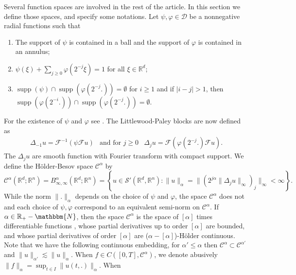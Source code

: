 \documentclass[a4paper,11pt]{article}
\newcommand{\tmop}[1]{\ensuremath{\operatorname{#1}}}
\newcommand{\CC}{\mathscr C}
\newcommand{\CF}{\mathscr F}
\newcommand{\RR}{\mathbb R}
\begin{document}
Several function spaces are involved in the rest of the article. In this
section we define those spaces, and specify some notations.
Let $\psi , \varphi \in \mathcal{D}$ be a nonnegative radial functions such
that
\begin{enumerate}
  \item The support of $\psi$ is contained in a ball and the support of
  $\varphi$ is contained in an annulus;
  
  \item $\psi ( \xi ) + \sum_{j \ge 0} \varphi (2^{-j} \xi ) =1$ for all $\xi
  \in \RR^{d}$;
  
  \item $\tmop{supp} ( \psi ) \cap \tmop{supp} ( \varphi (2^{-j} . )) =
  \emptyset$ for $i \ge 1$ and if $|i-j| >1$, then $\tmop{supp} ( \varphi
  (2^{-i}. )) \cap \tmop{supp} ( \varphi (2^{-j} .)) = \emptyset$.
\end{enumerate}
For the existence of $\psi$ and $\varphi$ see {\cite{bahouri_fourier_2011}}.
The Littlewood-Paley blocks are now defined as
\[ \begin{array}{crlc}
     \Delta_{-1} u= \CF^{-1} ( \psi \CF u) & \text{and for $j\ge 0$}
 & \Delta_{j} u= \CF ( \varphi (2^{-j} .) \CF u) .
   \end{array} \]
The $\Delta_{j} u$ are smooth function with Fourier transform with compact
support. We define the Hölder-Besov space $\CC^{\alpha}$ by
\begin{equation}\label{eq:besov_holder}
 \CC^{\alpha} ( \RR^{d} ; \RR^{n} ) =B^{\alpha}_{\infty , \infty} ( \RR^{d}
   ; \RR^{n} ) = \left\{ u \in \mathcal{S}' ( \RR^{d} , \RR^{n}
   ):\|u\|_{\alpha} =\| ( 2^{j \alpha} \| \Delta_{j} u\|_{\infty} )_{j}
   \|_{\infty} < \infty \right\} .
   \end{equation}
While the norm $\|.\|_{\alpha}$ depends on the choice of $\psi$ and $\varphi$,
the space $\CC^{\alpha}$ does not and each choice of $\psi , \varphi$
correspond to an equivalent semi-norm on $\CC^{\alpha}$. If $\alpha \in
\RR_{+} -\mathbbm{N}$, then the space $\CC^{\alpha}$ is the space of $[ \alpha
]$ times differentiable functions , whose partial derivatives up to order $[
\alpha ]$ are bounded, and whose partial derivatives of order $[ \alpha ]$
are ($\alpha - [ \alpha ]$)-Hölder continuous. Note that we have the
following continuous embedding, for $\alpha' \leqslant \alpha$ then
$\CC^{\alpha} \subset \CC^{\alpha'}$ and $\|u\|_{\alpha'} \lesssim
\|u\|_{\alpha}$. When $f \in C \left( [ 0,T ] , \CC^{\alpha} \right)^{}$, we
denote abusively $\| f \|_{\alpha} = \sup_{t \in I} \|u(t,.)\|_{\alpha}$. When
\end{document}
